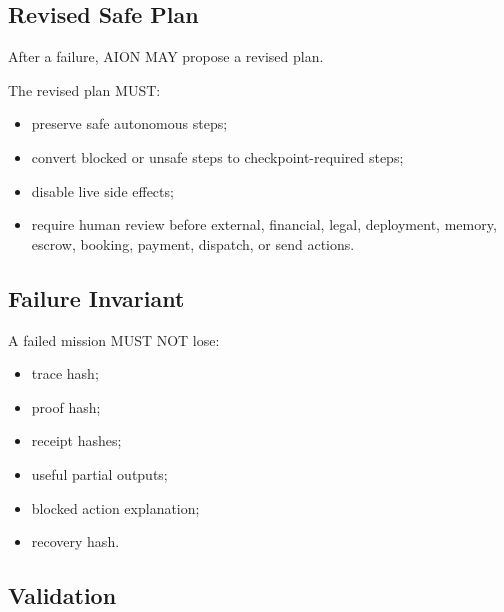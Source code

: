\subsection{Revised Safe Plan}

After a failure, AION MAY propose a revised plan.

The revised plan MUST:

\begin{itemize}
  \item preserve safe autonomous steps;
  \item convert blocked or unsafe steps to checkpoint-required steps;
  \item disable live side effects;
  \item require human review before external, financial, legal, deployment, memory, escrow, booking, payment, dispatch, or send actions.
\end{itemize}

\subsection{Failure Invariant}

A failed mission MUST NOT lose:

\begin{itemize}
  \item trace hash;
  \item proof hash;
  \item receipt hashes;
  \item useful partial outputs;
  \item blocked action explanation;
  \item recovery hash.
\end{itemize}

\subsection{Validation}

